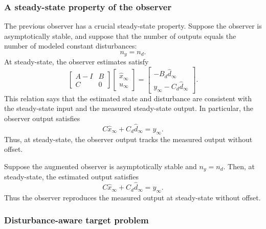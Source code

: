 \subsubsection{A steady-state property of the observer}

The previous observer has a crucial steady-state property. Suppose the observer is
asymptotically stable, and suppose that the number of outputs equals the number of modeled
constant disturbances:
\[
    n_y=n_d.
\]
At steady-state, the observer estimates satisfy
\[
    \begin{bmatrix}
        A-I & B\\
        C   & 0
    \end{bmatrix}
    \begin{bmatrix}
        \hat x_\infty\\
        u_\infty
    \end{bmatrix}
    =
    \begin{bmatrix}
        -B_d\hat d_\infty\\
        y_\infty-C_d\hat d_\infty
    \end{bmatrix}.
\]
This relation says that the estimated state and disturbance are consistent with the steady-state
input and the measured steady-state output. In particular, the observer output satisfies
\[
    C\hat x_\infty + C_d\hat d_\infty = y_\infty.
\]
Thus, at steady-state, the observer output tracks the measured output without offset.

\begin{theorembox}
Suppose the augmented observer is asymptotically stable and \(n_y=n_d\). Then, at
steady-state, the estimated output satisfies
\[
    C\hat x_\infty+C_d\hat d_\infty = y_\infty.
\]
Thus the observer reproduces the measured output at steady-state without offset.
\end{theorembox}

\subsubsection{Disturbance-aware target problem}

